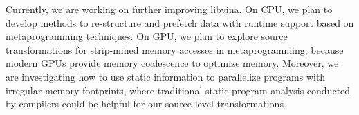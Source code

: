 
Currently, we are working on further improving libvina.
On CPU, we plan to develop methods to re-structure and
prefetch data with runtime support based on metaprogramming techniques.
On GPU, we plan to explore source
transformations for strip-mined memory accesses in metaprogramming,
because modern GPUs provide memory coalescence to optimize memory. 
Moreover,  we are investigating how to use static information
to parallelize programs with irregular memory
footprints, where traditional static program analysis
conducted by compilers could be helpful for our source-level transformations.


